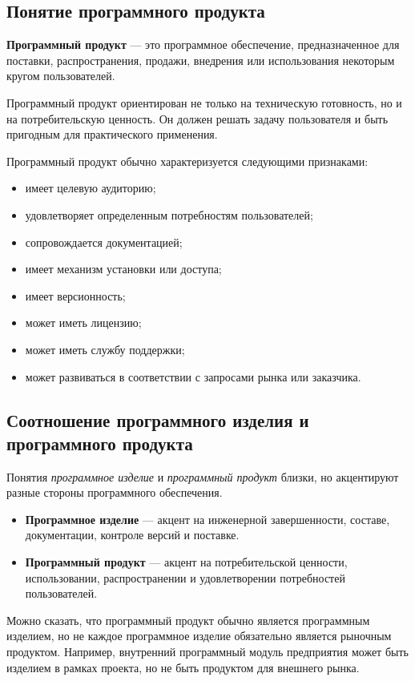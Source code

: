 \documentclass[12pt,a4paper]{article}
\begin{document}
\subsection{Понятие программного продукта}

\textbf{Программный продукт} --- это программное обеспечение, предназначенное для поставки, распространения, продажи, внедрения или использования некоторым кругом пользователей.

Программный продукт ориентирован не только на техническую готовность, но и на потребительскую ценность. Он должен решать задачу пользователя и быть пригодным для практического применения.

Программный продукт обычно характеризуется следующими признаками:

\begin{itemize}
    \item имеет целевую аудиторию;
    \item удовлетворяет определенным потребностям пользователей;
    \item сопровождается документацией;
    \item имеет механизм установки или доступа;
    \item имеет версионность;
    \item может иметь лицензию;
    \item может иметь службу поддержки;
    \item может развиваться в соответствии с запросами рынка или заказчика.
\end{itemize}

\subsection{Соотношение программного изделия и программного продукта}

Понятия \emph{программное изделие} и \emph{программный продукт} близки, но акцентируют разные стороны программного обеспечения.

\begin{itemize}
    \item \textbf{Программное изделие} --- акцент на инженерной завершенности, составе, документации, контроле версий и поставке.
    \item \textbf{Программный продукт} --- акцент на потребительской ценности, использовании, распространении и удовлетворении потребностей пользователей.
\end{itemize}

Можно сказать, что программный продукт обычно является программным изделием, но не каждое программное изделие обязательно является рыночным продуктом. Например, внутренний программный модуль предприятия может быть изделием в рамках проекта, но не быть продуктом для внешнего рынка.
\end{document}
